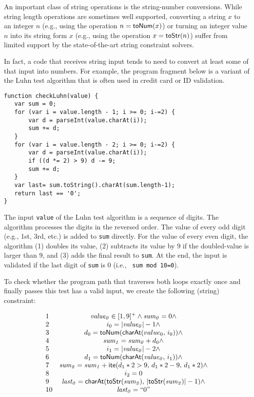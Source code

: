 \documentclass[sigplan,screen]{acmart}
\begin{document}
An important class of string operations is  the string-number conversions.  While string length operations are sometimes well supported, converting a string $x$ to an integer $n$ (e.g., using the operation $n = \mbox{\textsf{toNum}($x$)}$) or turning an integer value $n$ into its string form $x$ (e.g., using the operation $x = \mbox{\textsf{toStr}($n$)}$) suffer from limited support  by the state-of-the-art string constraint solvers. 


In fact, a code that receives string input tends to need to convert at least some of that input into numbers.
For example, the program fragment below is a variant of the Luhn test algorithm that is often used in credit card or ID validation.



\begin{Verbatim}[fontsize=\small]
function checkLuhn(value) {
   var sum = 0;
   for (var i = value.length - 1; i >= 0; i-=2) {
       var d = parseInt(value.charAt(i));
       sum += d;
   }	
   for (var i = value.length - 2; i >= 0; i-=2) {
       var d = parseInt(value.charAt(i));
       if ((d *= 2) > 9) d -= 9;
       sum += d;
   }
   var last= sum.toString().charAt(sum.length-1);
   return last == '0';
}
\end{Verbatim}


The input \verb|value| of the Luhn test algorithm is a sequence of digits. The algorithm processes the digits in the reversed order. The value of every odd digit (e.g., 1st, 3rd, etc.) is added to \verb|sum| directly. For the value of every even digit, the algorithm (1) doubles its value, (2) subtracts its value by $9$ if the doubled-value is larger than $9$, and (3) adds the final result to \verb|sum|. At the end, the input is validated if the last digit of \verb|sum| is $0$ (i.e., \verb| sum mod 10=0|).

To check whether the program path that traverses both loops exactly once and finally passes this test has a valid input, we create the following (string) constraint:

$$\begin{array}{lc}
1&	{\it value_0} \in [1,9]^+ \wedge 	{\it sum_0} = 0 \wedge \\
2&	i_0 = |{\it value_0}| -1 \wedge \\
3&	d_0 = \mbox{\textsf{toNum}($\mbox{\textsf{charAt}($value_0$, $i_0$)}$)} \wedge \\
4&	{\it sum_1} = {\it sum_0} + d_0 \wedge\\
5&	i_1 = |{\it value_0}| -2 \wedge \\
6&	d_1 = \mbox{\textsf{toNum}($\mbox{\textsf{charAt}(${\it value_0}$, $i_1$)}$)} \wedge \\
7&	{\it sum_2} = {\it sum_1} + \mbox{\textsf{ite}($d_1*2>9$, $d_1*2 -9$, $d_1*2$)} \wedge\\
8& i_2 = 0\\
9&	{\it last_0} = \mbox{\textsf{charAt}($\mbox{\textsf{toStr}(${\it sum_2}$)}$, $|\mbox{\textsf{toStr}(${\it sum_2}$)}|-1$)} \wedge\\
10&	{\it last_0} =``0"
\end{array}$$
\end{document}
